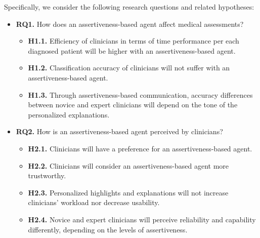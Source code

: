 \noindent
Specifically, we consider the following research questions and related hypotheses:

\vspace{0.5mm}

\begin{itemize}
\item {\bf RQ1.} How does an assertiveness-based agent affect medical assessments?
\begin{itemize}
\item {\bf H1.1.} Efficiency of clinicians in terms of time performance per each diagnosed patient will be higher with an assertiveness-based agent.
\item {\bf H1.2.} Classification accuracy of clinicians will not suffer with an assertiveness-based agent.
\item {\bf H1.3.} Through assertiveness-based communication, accuracy differences between novice and expert clinicians will depend on the tone of the personalized explanations.
\end{itemize}
\item {\bf RQ2.} How is an assertiveness-based agent perceived by clinicians?
\begin{itemize}
\item {\bf H2.1.} Clinicians will have a preference for an assertiveness-based agent.
\item {\bf H2.2.} Clinicians will consider an assertiveness-based agent more trustworthy.
\item {\bf H2.3.} Personalized highlights and explanations will not increase clinicians' workload nor decrease usability.
\item {\bf H2.4.} Novice and expert clinicians will perceive reliability and capability differently, depending on the levels of assertiveness.
\end{itemize}
\end{itemize}

